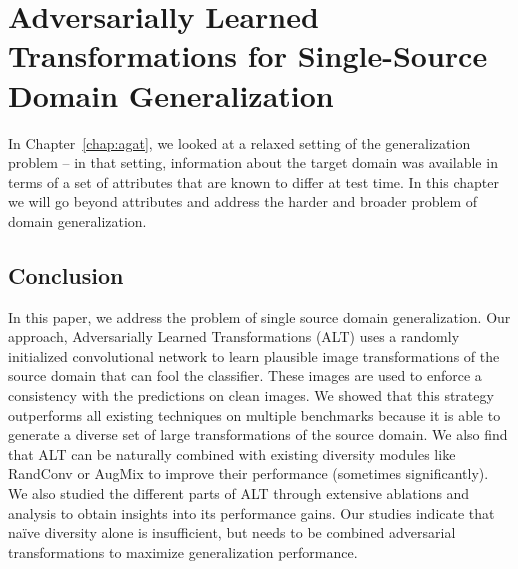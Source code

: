 \chapter{Adversarially Learned Transformations for Single-Source Domain Generalization}
\label{chap:alt}
In Chapter~\ref{chap:agat}, we looked at a relaxed setting of the generalization problem -- in that setting, information about the target domain was available in terms of a set of attributes that are known to differ at test time.
In this chapter we will go beyond attributes and address the harder and broader problem of domain generalization.



% 





\section{Conclusion}
In this paper, we address the problem of single source domain generalization. Our approach, Adversarially Learned Transformations (ALT) uses a randomly initialized convolutional network to learn plausible image transformations of the source domain that can fool the classifier. These images are used to enforce a consistency with the predictions on clean images. We showed that this strategy outperforms all existing techniques on multiple benchmarks because it is able to generate a diverse set of large transformations of the source domain. 
%
We also find that ALT can be naturally combined with existing diversity modules like RandConv or AugMix to improve their performance (sometimes significantly). We also studied the different parts of ALT through extensive ablations and analysis to obtain insights into its performance gains. Our studies indicate that na\"ive diversity alone is insufficient, but needs to be combined adversarial transformations to maximize generalization performance. 


